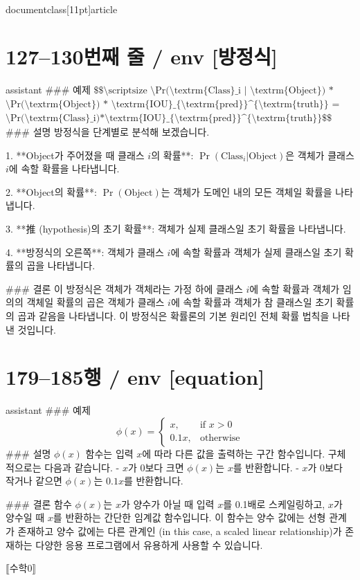 \\documentclass[11pt]{article}
\begin{document}
\section*{127–130번째 줄 / env [방정식]}
assistant
### 예제
$$
\scriptsize
\Pr(\textrm{Class}_i | \textrm{Object}) * \Pr(\textrm{Object}) * \textrm{IOU}_{\textrm{pred}}^{\textrm{truth}} = \Pr(\textrm{Class}_i)*\textrm{IOU}_{\textrm{pred}}^{\textrm{truth}}
$$
### 설명
방정식을 단계별로 분석해 보겠습니다.

1. **Object가 주어졌을 때 클래스 \(i\)의 확률**: \(\Pr(\textrm{Class}_i | \textrm{Object})\)은 객체가 클래스 \(i\)에 속할 확률을 나타냅니다.

2. **Object의 확률**: \(\Pr(\textrm{Object})\)는 객체가 도메인 내의 모든 객체일 확률을 나타냅니다.

3. **推 (hypothesis)의 초기 확률**: 객체가 실제 클래스일 초기 확률을 나타냅니다.

4. **방정식의 오른쪽**: 객체가 클래스 \(i\)에 속할 확률과 객체가 실제 클래스일 초기 확률의 곱을 나타냅니다.

### 결론
이 방정식은 객체가 객체라는 가정 하에 클래스 \(i\)에 속할 확률과 객체가 임의의 객체일 확률의 곱은 객체가 클래스 \(i\)에 속할 확률과 객체가 참 클래스일 초기 확률의 곱과 같음을 나타냅니다. 이 방정식은 확률론의 기본 원리인 전체 확률 법칙을 나타낸 것입니다.

\section*{179–185행 / env [equation]}
assistant
### 예제
$$
\phi(x) =
\begin{cases}
    x, & \text{if } x > 0\\
    0.1x, & \text{otherwise}
    \end{cases}
$$
### 설명
\(\phi(x)\) 함수는 입력 \(x\)에 따라 다른 값을 출력하는 구간 함수입니다. 구체적으로는 다음과 같습니다.
- \(x\)가 0보다 크면 \(\phi(x)\)는 \(x\)를 반환합니다.
- \(x\)가 0보다 작거나 같으면 \(\phi(x)\)는 \(0.1x\)를 반환합니다.

### 결론
함수 \(\phi(x)\)는 \(x\)가 양수가 아닐 때 입력 \(x\)를 0.1배로 스케일링하고, \(x\)가 양수일 때 \(x\)를 반환하는 간단한 임계값 함수입니다. 이 함수는 양수 값에는 선형 관계가 존재하고 양수 값에는 다른 관계인 (in this case, a scaled linear relationship)가 존재하는 다양한 응용 프로그램에서 유용하게 사용할 수 있습니다.

⟦수학0⟧
\end{document}
